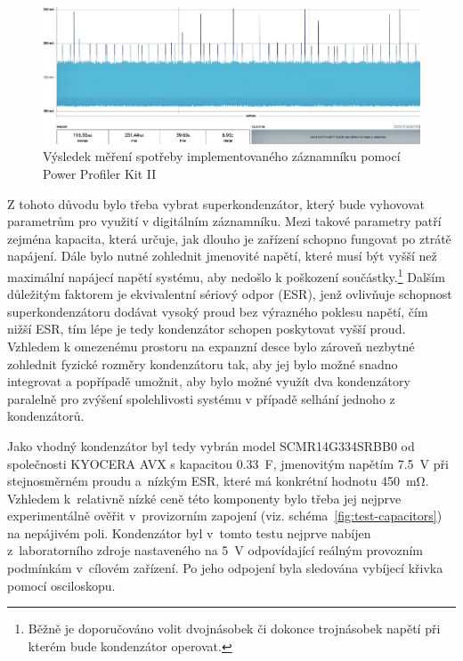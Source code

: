 \begin{figure}[h]
    \centering
    \includegraphics[width=1.00\textwidth]{obrazky-figures/power-consumption-4.jpg}
    
    \caption{Výsledek měření spotřeby implementovaného záznamníku pomocí Power Profiler Kit II 
   ~\cite{nordic_semi_ppk2}}
    \label{fig:power-consumption}
\end{figure}

Z tohoto důvodu bylo třeba vybrat superkondenzátor, který bude vyhovovat parametrům pro využití v digitálním záznamníku. Mezi takové parametry patří zejména kapacita, která určuje, jak dlouho je zařízení schopno fungovat po ztrátě napájení. Dále bylo nutné zohlednit jmenovité napětí, které musí být vyšší než maximální napájecí napětí systému, aby nedošlo k poškození součástky.\footnote{Běžně je doporučováno volit dvojnásobek či dokonce trojnásobek napětí při kterém bude kondenzátor operovat.} Dalším důležitým faktorem je ekvivalentní sériový odpor (ESR), jenž ovlivňuje schopnost superkondenzátoru dodávat vysoký proud bez výrazného poklesu napětí, čím nižší ESR, tím lépe je tedy kondenzátor schopen poskytovat vyšší proud. Vzhledem k omezenému prostoru na expanzní desce bylo zároveň nezbytné zohlednit fyzické rozměry kondenzátoru tak, aby jej bylo možné snadno integrovat a popřípadě umožnit, aby bylo možné využít dva kondenzátory paralelně pro zvýšení spolehlivosti systému v případě selhání jednoho z kondenzátorů.

Jako vhodný kondenzátor byl tedy vybrán model SCMR14G334SRBB0 od společnosti KYOCERA AVX s kapacitou \SI{0.33}{\farad}, jmenovitým napětím \SI{7.5}{\volt} při stejnosměrném proudu a~nízkým ESR, které má konkrétní hodnotu \SI{450}{\milli\ohm}. Vzhledem k~relativně nízké ceně této komponenty bylo třeba jej nejprve experimentálně ověřit v~provizorním zapojení (viz. schéma~\ref{fig:test-capacitors}) na nepájivém poli. Kondenzátor byl v~tomto testu nejprve nabíjen z~laboratorního zdroje nastaveného na \SI{5}{\volt} odpovídající reálným provozním podmínkám v~cílovém zařízení. Po jeho odpojení byla sledována vybíjecí křivka pomocí osciloskopu.

